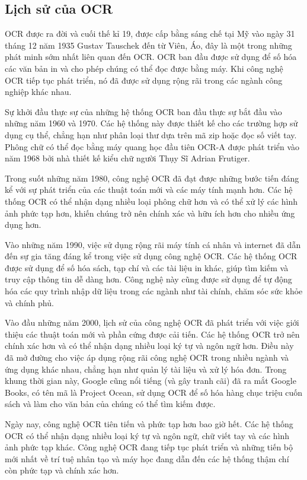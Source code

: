 \subsection{Lịch sử của OCR}

OCR được ra đời và cuối thế kỉ 19, được cấp bằng sáng chế tại Mỹ vào ngày 31 tháng 12 năm 1935 Gustav Tauschek đến từ Viên, Áo, đây là một trong những phát minh sớm nhất liên quan đến OCR. OCR ban đầu được sử dụng để số hóa các văn bản in và cho phép chúng có thể đọc được bằng máy. Khi công nghệ OCR tiếp tục phát triển, nó đã được sử dụng rộng rãi trong các ngành công nghiệp khác nhau.

Sự khởi đầu thực sự của những hệ thống OCR ban đầu thực sự bắt đầu vào những năm 1960 và 1970. Các hệ thống này được thiết kế cho các trường hợp sử dụng cụ thể, chẳng hạn như phân loại thư dựa trên mã zip hoặc đọc số viết tay. Phông chữ có thể đọc bằng máy quang học đầu tiên OCR-A được phát triển vào năm 1968 bởi nhà thiết kế kiểu chữ người Thụy Sĩ Adrian Frutiger.

Trong suốt những năm 1980, công nghệ OCR đã đạt được những bước tiến đáng kể với sự phát triển của các thuật toán mới và các máy tính mạnh hơn. Các hệ thống OCR có thể nhận dạng nhiều loại phông chữ hơn và có thể xử lý các hình ảnh phức tạp hơn, khiến chúng trở nên chính xác và hữu ích hơn cho nhiều ứng dụng hơn.

Vào những năm 1990, việc sử dụng rộng rãi máy tính cá nhân và internet đã dẫn đến sự gia tăng đáng kể trong việc sử dụng công nghệ OCR. Các hệ thống OCR được sử dụng để số hóa sách, tạp chí và các tài liệu in khác, giúp tìm kiếm và truy cập thông tin dễ dàng hơn. Công nghệ này cũng được sử dụng để tự động hóa các quy trình nhập dữ liệu trong các ngành như tài chính, chăm sóc sức khỏe và chính phủ.

Vào đầu những năm 2000, lịch sử của công nghệ OCR đã phát triển với việc giới thiệu các thuật toán mới và phần cứng được cải tiến. Các hệ thống OCR trở nên chính xác hơn và có thể nhận dạng nhiều loại ký tự và ngôn ngữ hơn. Điều này đã mở đường cho việc áp dụng rộng rãi công nghệ OCR trong nhiều ngành và ứng dụng khác nhau, chẳng hạn như quản lý tài liệu và xử lý hóa đơn. Trong khung thời gian này, Google cũng nổi tiếng (và gây tranh cãi) đã ra mắt Google Books, có tên mã là Project Ocean, sử dụng OCR để số hóa hàng chục triệu cuốn sách và làm cho văn bản của chúng có thể tìm kiếm được.

Ngày nay, công nghệ OCR tiên tiến và phức tạp hơn bao giờ hết. Các hệ thống OCR có thể nhận dạng nhiều loại ký tự và ngôn ngữ, chữ viết tay và các hình ảnh phức tạp khác. Công nghệ OCR đang tiếp tục phát triển và những tiến bộ mới nhất về trí tuệ nhân tạo và máy học đang dẫn đến các hệ thống thậm chí còn phức tạp và chính xác hơn.

